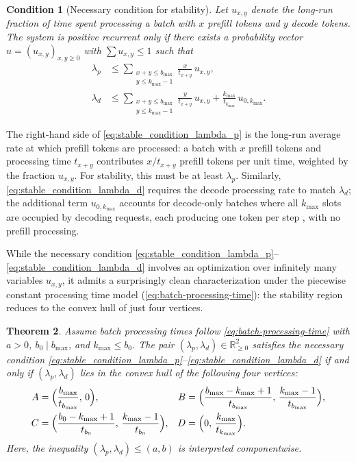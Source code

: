 \documentclass[11pt]{article}
\theoremstyle{plain}
\newtheorem{theorem}{Theorem}
\newtheorem{condition}[theorem]{Condition}
\theoremstyle{definition}
\theoremstyle{remark}
\begin{document}
\begin{condition}[Necessary condition for stability]
\label{stable_condition}
Let $u_{x,y}$ denote the long-run fraction of time spent processing a batch with $x$ prefill tokens and $y$ decode tokens. The system is positive recurrent only if there exists a probability vector $u = (u_{x,y})_{x,y \ge 0}$ with $\sum u_{x,y} \le 1$ such that
\begin{align}
    \lambda_p &\le \sum_{\substack{x+y \le b_{\max} \\ y \le k_{\max}-1}} \frac{x}{t_{x+y}}\, u_{x,y}, \label{eq:stable_condition_lambda_p} \\
    \lambda_d &\le \sum_{\substack{x+y \le b_{\max} \\ y \le k_{\max}-1}} \frac{y}{t_{x+y}}\, u_{x,y} + \frac{k_{\max}}{t_{k_{\max}}}\, u_{0,k_{\max}}. \label{eq:stable_condition_lambda_d}
\end{align}
\end{condition}
The right-hand side of \cref{eq:stable_condition_lambda_p} is the long-run average rate at which prefill tokens are processed: a batch with $x$ prefill tokens and processing time $t_{x+y}$ contributes $x/t_{x+y}$ prefill tokens per unit time, weighted by the fraction $u_{x,y}$. For stability, this must be at least $\lambda_p$. Similarly, \cref{eq:stable_condition_lambda_d} requires the decode processing rate to match $\lambda_d$; the additional term $u_{0,k_{\max}}$ accounts for decode-only batches where all $k_{\max}$ slots are occupied by decoding requests, each producing one token per step , with no prefill processing.

While the necessary condition \cref{eq:stable_condition_lambda_p}--\cref{eq:stable_condition_lambda_d} involves an optimization over infinitely many variables $u_{x,y}$, it admits a surprisingly clean characterization under the piecewise constant processing time model (\cref{eq:batch-processing-time}): the stability region reduces to the convex hull of just four vertices.

\begin{theorem} \label{convex_hull}
Assume batch processing times follow \cref{eq:batch-processing-time} with $a > 0$, $b_0 \mid b_{\max}$, and $k_{\max} \le b_0$. The pair $(\lambda_p, \lambda_d) \in \mathbb{R}^2_{\ge 0}$ satisfies the necessary condition \cref{eq:stable_condition_lambda_p}--\cref{eq:stable_condition_lambda_d} if and only if $(\lambda_p, \lambda_d)$ lies in the convex hull of the following four vertices:
\begin{align*}
    A &= \Bigl(\frac{b_{\max}}{t_{b_{\max}}},\, 0\Bigr), &
    B &= \Bigl(\frac{b_{\max}-k_{\max}+1}{t_{b_{\max}}},\, \frac{k_{\max}-1}{t_{b_{\max}}}\Bigr), \\
    C &= \Bigl(\frac{b_0-k_{\max}+1}{t_{b_0}},\, \frac{k_{\max}-1}{t_{b_0}}\Bigr), &
    D &= \Bigl(0,\, \frac{k_{\max}}{t_{k_{\max}}}\Bigr).
\end{align*}
Here, the inequality $(\lambda_p, \lambda_d) \le (a, b)$ is interpreted componentwise.
\end{theorem}
\end{document}
